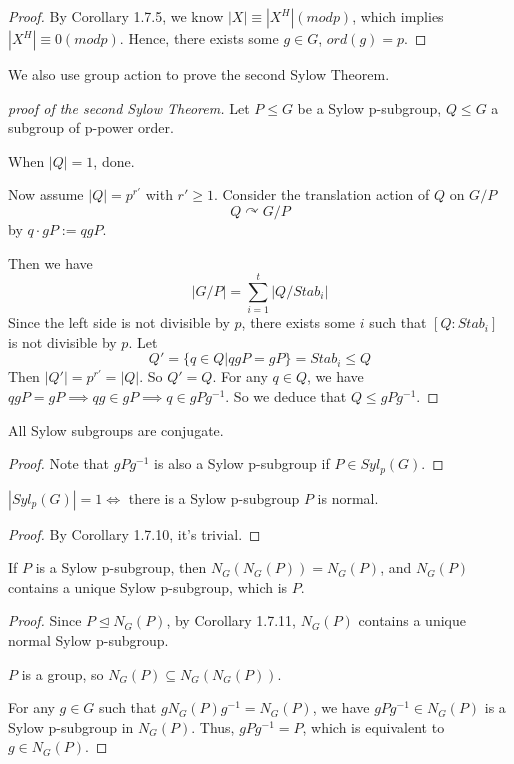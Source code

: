 \documentclass[11pt,fleqn]{book} %
\begin{document}
\begin{CJK}{UTF8}{gkai}
\begin{proof}
	By Corollary 1.7.5, we know $|X| \equiv |X^H| (mod p)$, which implies $|X^H| \equiv 0 (mod p)$. Hence, there exists some $g \in G$, $ord(g) = p$.
\end{proof}

We also use group action to prove the second Sylow Theorem.
\begin{proof}
	[proof of the second Sylow Theorem] Let $P \leq G$ be a Sylow p-subgroup, $Q \leq G$ a subgroup of p-power order. 

	When $|Q| = 1$, done.

	Now assume $|Q| = p^{r'}$ with $r' \geq 1$. Consider the translation action of $Q$ on $G/P$
	\[Q\curvearrowright G/P\]
	by $q\cdot gP := qgP$.

	Then we have 
	\[|G/P| = \sum_{i=1}^t |Q/Stab_i|\]
	Since the left side is not divisible by $p$, there exists some $i$ such that $[Q : Stab_i]$ is not divisible by $p$. Let 
	\[Q' = \{q\in Q | qgP = gP\} = Stab_i \leq Q\]
	Then $|Q'| = p^{r'} = |Q|$. So $Q' = Q$. For any $q \in Q$, we have $qgP = gP \implies qg \in gP \implies q \in gPg^{-1}$.
	So we deduce that $Q \leq gPg^{-1}$. 
\end{proof}

\begin{corollary}
	All Sylow subgroups are conjugate.
\end{corollary}
\begin{proof}
	Note that $gPg^{-1}$ is also a Sylow p-subgroup if $P \in Syl_p(G)$.
\end{proof}

\begin{corollary}
	$|Syl_p(G)| = 1 \iff $ there is a Sylow p-subgroup $P$ is normal.
\end{corollary}
\begin{proof}
	By Corollary 1.7.10, it's trivial.
\end{proof}

\begin{corollary}
	If $P$ is a Sylow p-subgroup, then $N_G(N_G(P)) = N_G(P)$, and $N_G(P)$ contains a unique Sylow p-subgroup, which is $P$.
\end{corollary}
\begin{proof}
	Since $P \unlhd N_G(P)$, by Corollary 1.7.11, $N_G(P)$ contains a unique normal Sylow p-subgroup. 

	$P$ is a group, so $N_G(P) \subseteq N_G(N_G(P))$. 
	
	For any $g\in G$ such that $gN_G(P)g^{-1} = N_G(P)$, we have $gPg^{-1} \in N_G(P)$ is a Sylow p-subgroup in $N_G(P)$. Thus, $gPg^{-1} = P$,
	which is equivalent to $g \in N_G(P)$.
\end{proof}


\end{CJK}
\end{document}
